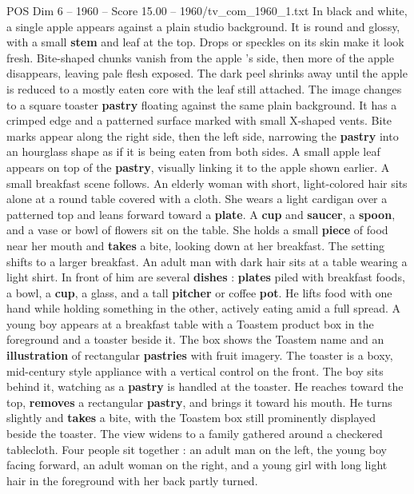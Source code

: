 \begin{textsample}{POS Dim 6 – 1960 – Score 15.00 – 1960/tv\_com\_1960\_1.txt}  \label{ex:f6_pos_023}
In black and white, a single apple appears against a plain studio background.
It is round and glossy, with a small \textbf{stem} and leaf at the top.
Drops or speckles on its skin make it look fresh.
Bite-shaped chunks vanish from the apple ’s side, then more of the apple disappears, leaving pale flesh exposed.
The dark peel shrinks away until the apple is reduced to a mostly eaten core with the leaf still attached.
The image changes to a square toaster \textbf{pastry} floating against the same plain background.
It has a crimped edge and a patterned surface marked with small X-shaped vents.
Bite marks appear along the right side, then the left side, narrowing the \textbf{pastry} into an hourglass shape as if it is being eaten from both sides.
A small apple leaf appears on top of the \textbf{pastry}, visually linking it to the apple shown earlier.
A small breakfast scene follows.
An elderly woman with short, light-colored hair sits alone at a round table covered with a cloth.
She wears a light cardigan over a patterned top and leans forward toward a \textbf{plate}.
A \textbf{cup} and \textbf{saucer}, a \textbf{spoon}, and a vase or bowl of flowers sit on the table.
She holds a small \textbf{piece} of food near her mouth and \textbf{takes} a bite, looking down at her breakfast.
The setting shifts to a larger breakfast.
An adult man with dark hair sits at a table wearing a light shirt.
In front of him are several \textbf{dishes} : \textbf{plates} piled with breakfast foods, a bowl, a \textbf{cup}, a glass, and a tall \textbf{pitcher} or coffee \textbf{pot}.
He lifts food with one hand while holding something in the other, actively eating amid a full spread.
A young boy appears at a breakfast table with a Toastem product box in the foreground and a toaster beside it.
The box shows the Toastem name and an \textbf{illustration} of rectangular \textbf{pastries} with fruit imagery.
The toaster is a boxy, mid-century style appliance with a vertical control on the front.
The boy sits behind it, watching as a \textbf{pastry} is handled at the toaster.
He reaches toward the top, \textbf{removes} a rectangular \textbf{pastry}, and brings it toward his mouth.
He turns slightly and \textbf{takes} a bite, with the Toastem box still prominently displayed beside the toaster.
The view widens to a family gathered around a checkered tablecloth.
Four people sit together : an adult man on the left, the young boy facing forward, an adult woman on the right, and a young girl with long light hair in the foreground with her back partly turned.

\end{textsample}
